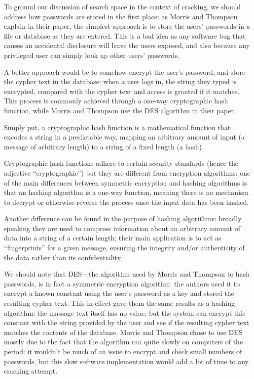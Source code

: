 To ground our discussion of search space in the context of cracking, we should address how passwords are stored in the first place: as Morris and Thompson explain in their paper, the simplest approach is to store the users' passwords in a file or database as they are entered. This is a bad idea as any software bug that causes an accidental disclosure will leave the users exposed, and also because any privileged user can simply look up other users' passwords.

A better approach would be to somehow encrypt the user's password, and store the cypher text in the database: when a user logs in, the string they typed is encrypted, compared with the cypher text and access is granted if it matches. This process is commonly achieved through a one-way cryptographic hash function, while Morris and Thompson use the DES algorithm in their paper.

Simply put, a cryptographic hash function is a mathematical function that encodes a string in a predictable way, mapping an arbitrary amount of input (a message of arbitrary length) to a string of a fixed length (a hash). 

Cryptographic hash functions adhere to certain security standards (hence the adjective \enquote{cryptographic}) but they are different from encryption algorithms: %
one of the main differences between symmetric encryption and hashing algorithms is that an hashing algorithm is a one-way function, meaning there is no mechanism to decrypt or otherwise reverse the process once the input data has been hashed. 

Another difference can be found in the purpose of hashing algorithms: broadly speaking they are used to compress information about an arbitrary amount of data into a string of a certain length; their main application is to act as \enquote{fingerprints} for a given message, ensuring the integrity and/or authenticity of the data rather than its confidentiality.

We should note that DES - the algorithm used by Morris and Thompson \cite{Thompson1979} to hash passwords, is in fact a symmetric encryption algorithm: the authors used it to encrypt a known constant using the user's password as a key and stored the resulting cypher text.
This in effect gave them the same results as a hashing algorithm: the massage text itself has no value, but the system can encrypt this constant with the string provided by the user and see if the resulting cypher text matches the contents of the database.
Morris and Thompson chose to use DES mostly due to the fact that the algorithm ran quite slowly on computers of the period: it wouldn't be much of an issue to encrypt and check small numbers of passwords, but this slow software implementation would add a lot of time to any cracking attempt.

